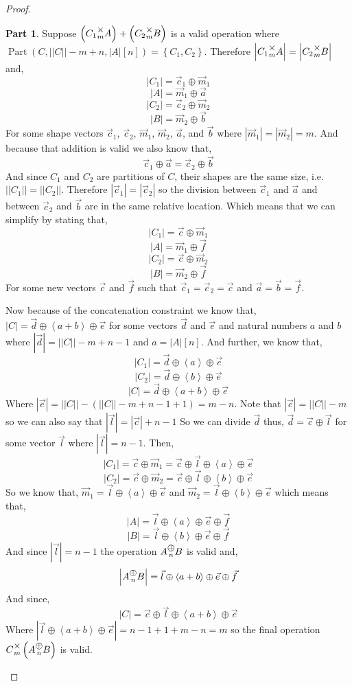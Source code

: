 \documentclass[12pt]{book}
\theoremstyle{plain}
\theoremstyle{definition}
\theoremstyle{ppart}
\newtheorem{ppart}{Part}
\theoremstyle{case}
\theoremstyle{solution}
\DeclareMathOperator{\Part}{Part}
\newcommand{\mmult}[1]{\text{\raisebox{1ex}{$\underset{#1}{\times}$}}}
\newcommand{\mconcat}[1]{\text{\raisebox{1ex}{$\underset{#1}{\oplus}$}}}
\newcommand{\shape}[1]{\left|#1\right|}
\begin{document}
\begin{landscape}
\begin{proof}
\begin{ppart}
Suppose $\left(C_1 \mmult{m} A\right) + \left(C_2 \mmult{m} B\right)$ is a valid operation
where $\Part(C, \shape{\shape{C}}-m+n, \shape{A}[n]) = \left\{ C_1, C_2 \right\}$.
Therefore $\shape{C_1 \mmult{m} A} = \shape{C_2 \mmult{m} B}$ and,
\[ \shape{C_1} = \vec{c}_1 \oplus \vec{m}_1 \]
\[ \shape{A} = \vec{m}_1 \oplus \vec{a} \]
\[ \shape{C_2} = \vec{c}_2 \oplus \vec{m}_2 \]
\[ \shape{B} = \vec{m}_2 \oplus \vec{b} \]
For some shape vectors $\vec{c}_1$, $\vec{c}_2$, $\vec{m}_1$, $\vec{m}_2$, $\vec{a}$, and $\vec{b}$ where $\shape{\vec{m}_1} = \shape{\vec{m}_2} = m$.
And because that addition is valid we also know that,
\[ \vec{c}_1 \oplus \vec{a} = \vec{c}_2 \oplus \vec{b} \]
And since $C_1$ and $C_2$ are partitions of $C$, their shapes are the same size, i.e. $\shape{\shape{C_1}} = \shape{\shape{C_2}}$.
Therefore $\shape{\vec{c}_1} = \shape{\vec{c}_2}$ so the division between $\vec{c}_1$ and $\vec{a}$ and between
$\vec{c}_2$ and $\vec{b}$ are in the same relative location. Which means that
we can simplify by stating that,
\[ \shape{C_1} = \vec{c} \oplus \vec{m}_1 \]
\[ \shape{A} = \vec{m}_1 \oplus \vec{f} \]
\[ \shape{C_2} = \vec{c} \oplus \vec{m}_2 \]
\[ \shape{B} = \vec{m}_2 \oplus \vec{f} \]
For some new vectors $\vec{c}$ and $\vec{f}$ such that $\vec{c}_1 = \vec{c}_2 = \vec{c}$ and $\vec{a} = \vec{b} = \vec{f}$.

Now because of the concatenation constraint we know that,
$\shape{C} = \vec{d} \oplus \left< a+b \right> \oplus \vec{e}$ for some vectors $\vec{d}$ and $\vec{e}$ and
natural numbers $a$ and $b$ where $\shape{\vec{d}} = \shape{\shape{C}}-m+n-1$ and $a = \shape{A}[n]$.
And further, we know that,
\[ \shape{C_1} = \vec{d} \oplus \left< a \right> \oplus \vec{e} \]
\[ \shape{C_2} = \vec{d} \oplus \left< b \right> \oplus \vec{e} \]
\[ \shape{C} = \vec{d} \oplus \left< a+b \right> \oplus \vec{e} \]
Where $\shape{\vec{e}} = \shape{\shape{C}}-(\shape{\shape{C}}-m+n-1+1) = m-n$.
Note that $\shape{\vec{c}} = \shape{\shape{C}}-m$ so we can also say that $\shape{\vec{l}} = \shape{\vec{c}}+n-1$
So we can divide $\vec{d}$ thus, $\vec{d} = \vec{c} \oplus \vec{l}$ for some vector $\vec{l}$ where $\shape{\vec{l}} = n-1$.
Then,
\[ \shape{C_1} = \vec{c} \oplus \vec{m}_1 = \vec{c} \oplus \vec{l} \oplus \left< a \right> \oplus \vec{e} \]
\[ \shape{C_2} = \vec{c} \oplus \vec{m}_2 = \vec{c} \oplus \vec{l} \oplus \left< b \right> \oplus \vec{e} \]
So we know that, $\vec{m}_1 = \vec{l} \oplus \left< a \right> \oplus \vec{e}$ and $\vec{m}_2 = \vec{l} \oplus \left< b \right> \oplus \vec{e}$
which means that,
\[ \shape{A} = \vec{l} \oplus \left< a \right> \oplus \vec{e} \oplus \vec{f} \]
\[ \shape{B} = \vec{l} \oplus \left< b \right> \oplus \vec{e} \oplus \vec{f} \]
And since $\shape{\vec{l}} = n-1$ the operation $A \mconcat{n} B$ is valid and,
\[ \shape{A \mconcat{n} B} = \vec{l} \oplus \left< a+b \right> \oplus \vec{e} \oplus \vec{f} \]
And since,
\[ \shape{C} = \vec{c} \oplus \vec{l} \oplus \left< a+b \right> \oplus \vec{e} \]
Where $\shape{\vec{l} \oplus \left<a+b\right> \oplus \vec{e}} = n-1 + 1 + m-n = m$ so the final operation $C \mmult{m} \left(A \mconcat{n} B\right)$ is valid.
\end{ppart}


\end{proof}
\end{landscape}
\end{document}
